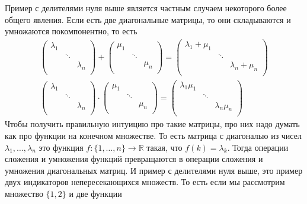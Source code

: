 Пример с делителями нуля выше является частным случаем некоторого более общего явления.
Если есть две диагональные матрицы, то они складываются и умножаются покомпонентно, то есть
\begin{gather*}
\begin{pmatrix}
{\lambda_1}&{}&{}\\
{}&{\ddots}&{}\\
{}&{}&{\lambda_n}\\
\end{pmatrix}
+
\begin{pmatrix}
{\mu_1}&{}&{}\\
{}&{\ddots}&{}\\
{}&{}&{\mu_n}\\
\end{pmatrix}
=
\begin{pmatrix}
{\lambda_1 + \mu_1}&{}&{}\\
{}&{\ddots}&{}\\
{}&{}&{\lambda_n + \mu_n}\\
\end{pmatrix}
\\
\begin{pmatrix}
{\lambda_1}&{}&{}\\
{}&{\ddots}&{}\\
{}&{}&{\lambda_n}\\
\end{pmatrix}
\cdot
\begin{pmatrix}
{\mu_1}&{}&{}\\
{}&{\ddots}&{}\\
{}&{}&{\mu_n}\\
\end{pmatrix}
=
\begin{pmatrix}
{\lambda_1 \mu_1}&{}&{}\\
{}&{\ddots}&{}\\
{}&{}&{\lambda_n  \mu_n}\\
\end{pmatrix}
\end{gather*}
Чтобы получить правильную интуицию про такие матрицы, про них надо думать как про функции на конечном множестве.
То есть матрица с диагональю из чисел $\lambda_1,\ldots,\lambda_n$ это функция $f\colon \{1,\ldots, n\}\to \mathbb R$ такая, что $f(k) = \lambda_k$.
Тогда операции сложения и умножения функций превращаются в операции сложения и умножения диагональных матриц.
И пример с делителями нуля выше, это пример двух индикаторов непересекающихся множеств.
То есть если мы рассмотрим множество $\{1, 2\}$ и две функции
